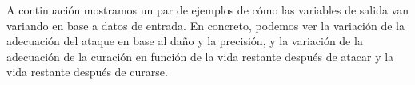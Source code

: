 A continuación mostramos un par de ejemplos de cómo las variables de salida van variando en base a datos de entrada. En concreto, podemos ver la variación de la adecuación del ataque en base al daño y la precisión, y la variación de la adecuación de la curación en función de la vida restante después de atacar y la vida restante después de curarse.
